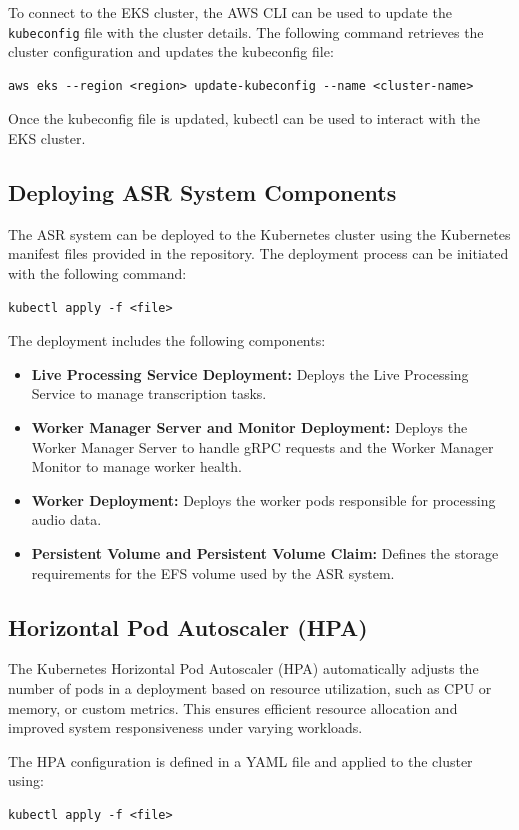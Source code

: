 To connect to the EKS cluster, the AWS CLI can be used to update the \texttt{kubeconfig} file with the cluster details. The following command retrieves the cluster configuration and updates the kubeconfig file:
\begin{verbatim}
aws eks --region <region> update-kubeconfig --name <cluster-name>
\end{verbatim}

Once the kubeconfig file is updated, kubectl can be used to interact with the EKS cluster.

\subsection{Deploying ASR System Components}
The ASR system can be deployed to the Kubernetes cluster using the Kubernetes manifest files provided in the repository. The deployment process can be initiated with the following command:
\begin{verbatim}
kubectl apply -f <file>
\end{verbatim}

The deployment includes the following components:
\begin{itemize}
    \item \textbf{Live Processing Service Deployment:} Deploys the Live Processing Service to manage transcription tasks.
    \item \textbf{Worker Manager Server and Monitor Deployment:} Deploys the Worker Manager Server to handle gRPC requests and the Worker Manager Monitor to manage worker health.
    \item \textbf{Worker Deployment:} Deploys the worker pods responsible for processing audio data.
    \item \textbf{Persistent Volume and Persistent Volume Claim:}  Defines the storage requirements for the EFS  volume used by the ASR system.
\end{itemize}

\subsection{Horizontal Pod Autoscaler (HPA)}
The Kubernetes Horizontal Pod Autoscaler (HPA) automatically adjusts the number of pods in a deployment based on resource utilization, such as CPU or memory, or custom metrics. This ensures efficient resource allocation and improved system responsiveness under varying workloads.

The HPA configuration is defined in a YAML file and applied to the cluster using:
\begin{verbatim}
kubectl apply -f <file>
\end{verbatim}

